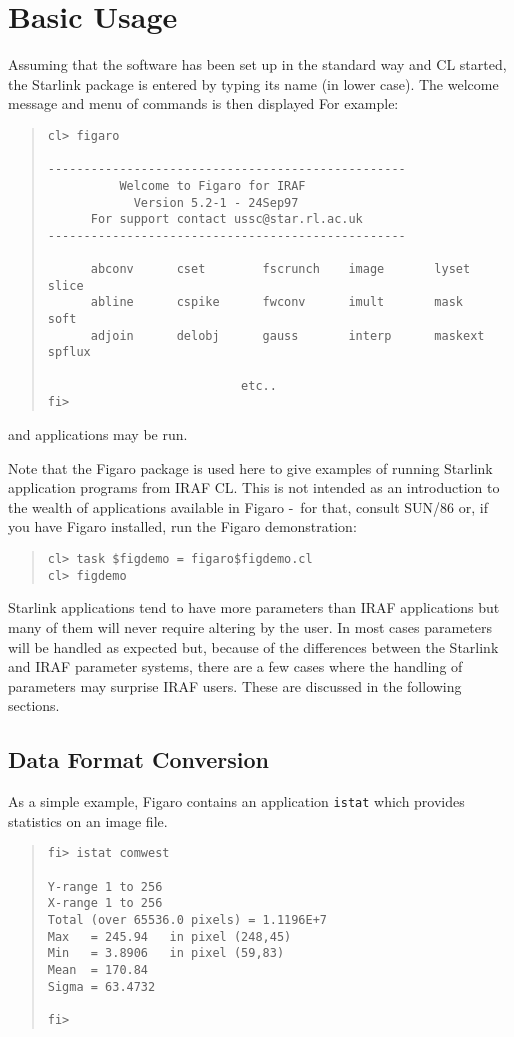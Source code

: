 \documentclass[twoside,11pt]{article}
\newcommand{\xref}[3]{#1}
\newcommand{\xlabel}[1]{}
\newcommand{\dash}{--}
\renewcommand{\dash}{-}
\begin{document}
\section{\xlabel{basic_usage}Basic Usage}
Assuming that the software has been set up in the standard way and CL started,
the Starlink package is entered by typing its name (in lower case). The welcome
message and menu of commands is then displayed
For example:
\begin{quote} \begin{verbatim}
cl> figaro

--------------------------------------------------
          Welcome to Figaro for IRAF
            Version 5.2-1 - 24Sep97
      For support contact ussc@star.rl.ac.uk
--------------------------------------------------

      abconv      cset        fscrunch    image       lyset       slice
      abline      cspike      fwconv      imult       mask        soft
      adjoin      delobj      gauss       interp      maskext     spflux

                           etc..
fi>
\end{verbatim} \end{quote}
and applications may be run.

Note that the Figaro package is used here to give examples of running Starlink
application programs from IRAF CL. This is not intended as an introduction to
the wealth of applications available in Figaro \dash\ for that, consult
\xref{SUN/86}{sun86}{}
or, if you have Figaro installed, run the Figaro demonstration:
\begin{quote} \begin{verbatim}
cl> task $figdemo = figaro$figdemo.cl
cl> figdemo
\end{verbatim} \end{quote}

Starlink applications tend to have more parameters than IRAF applications but
many of them will never require altering by the user.
In most cases parameters will be handled as expected but, because of the
differences between the Starlink and IRAF parameter systems, there are a few
cases where the handling of parameters may surprise IRAF users.
These are discussed in the following sections.

\subsection{\xlabel{data_format_conversion}Data Format Conversion}
As a simple example, Figaro contains an application \texttt{istat} which
provides statistics on an image file.
\begin{quote} \begin{verbatim}
fi> istat comwest

Y-range 1 to 256
X-range 1 to 256
Total (over 65536.0 pixels) = 1.1196E+7
Max   = 245.94   in pixel (248,45)
Min   = 3.8906   in pixel (59,83)
Mean  = 170.84
Sigma = 63.4732

fi>
\end{verbatim} \end{quote}
\end{document}
